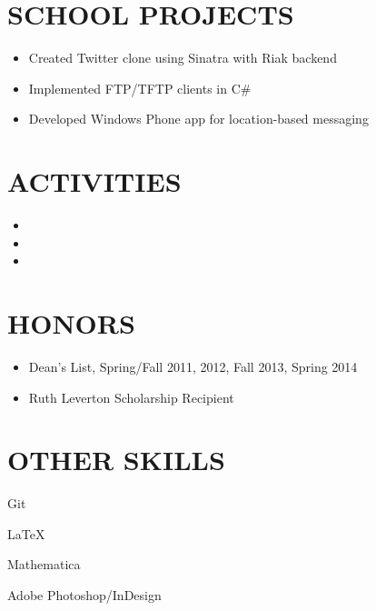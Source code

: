 \documentclass[margin]{res}
\begin{document}
\begin{resume}
    \vspace{-11pt}

    \section{SCHOOL PROJECTS}
      \begin{itemize}
        \item Created Twitter clone using Sinatra with Riak backend
        \item Implemented FTP/TFTP clients in C\#
        \item Developed Windows Phone app for location-based messaging
      \end{itemize}

    \section{ACTIVITIES}
    \begin{itemize}
      \item {}
      \item {}
      \item {}
    \end{itemize}

    \section{HONORS}
    \begin{itemize}
      \item Dean's List, Spring/Fall 2011, 2012, Fall 2013, Spring 2014
      \item Ruth Leverton Scholarship Recipient
    \end{itemize}

    \section{OTHER SKILLS}
      \begin{itemize*}[itemjoin=\hspace{5pt}]
        \item Git
        \item \LaTeX
        \item Mathematica
        \item Adobe Photoshop/InDesign
      \end{itemize*}

      \hspace{82pt}\printavailability %
  \end{resume}
\end{document}
